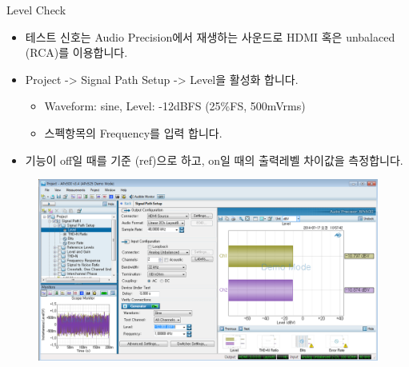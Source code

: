 \documentclass{beamer}
\begin{document}
\begin{frame}[t]{Level Check}
\begin{itemize}
\item 테스트 신호는 Audio Precision에서 재생하는 사운드로 HDMI 혹은 unbalaced (RCA)를 이용합니다.
\item Project -> Signal Path Setup -> Level을 활성화 합니다.
	\begin{itemize}
	\item Waveform: sine, Level: -12dBFS (25\%FS, 500mVrms)
	\item 스펙항목의 Frequency를 입력 합니다.
	\end{itemize}
\item 기능이 off일 때를 기준 (ref)으로 하고, on일 때의 출력레벨 차이값을 측정합니다.
\end{itemize}

\begin{figure}[r]
\includegraphics[height=0.4\textwidth]{figure/apsetting/level.png}
\end{figure}

\end{frame}
\end{document}
